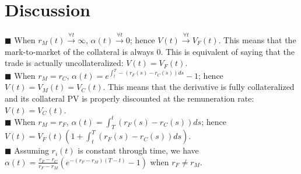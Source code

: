 \documentclass[twoside,twocolumn]{article}
\begin{document}




\section{Discussion}





$\blacksquare$ When $r_{M}(t) \xrightarrow{\forall t} \infty$, $\alpha(t) \xrightarrow{\forall t} 0$; hence $V(t) \xrightarrow{\forall t} V_{F}(t)$. This means that the mark-to-market of the collateral is always 0. This is equivalent of saying that the trade is actually uncollateralized: $V(t) = V_{F}(t)$. \\
$\blacksquare$ When $r_{M} = r_{C}$, $\alpha(t) = e^{\int_t^T -(r_{F}(s)-r_{C}(s))ds}-1$; hence $V(t) = V_{M}(t) = V_{C}(t)$. This means that the derivative is fully collateralized and its collateral PV is properly discounted at the remuneration rate: $V(t) = V_{C}(t)$. \\
$\blacksquare$ When $r_{M} = r_{F}$, $\alpha(t) = \int_T^t (r_{F}(s)-r_{C}(s))ds$; hence $V(t) = V_{F}(t) (1+\int_t^T (r_{F}(s)-r_{C}(s))ds)$.\\

$\blacksquare$ Assuming $r_{i}(t)$ is constant through time, we have $\alpha(t)=\frac{r_{F}-r_{C}}{r_{F}-r_{M}}(e^{-(r_{F}-r_{M})(T-t)}-1)$ when $r_{F} \neq r_{M}$.
\end{document}
